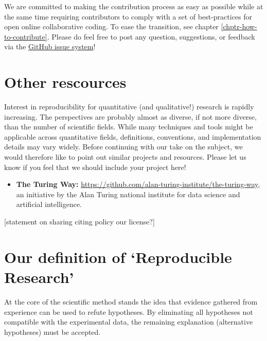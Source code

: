 \documentclass[]{book}
\providecommand{\tightlist}{%
  \setlength{\itemsep}{0pt}\setlength{\parskip}{0pt}}
\begin{document}
We are committed to making the contribution process as easy as possible
while at the same time requiring contributors to comply with a set of
best-practices for open online collaborative coding. To ease the
transition, see chapter \ref{chptr-how-to-contribute}. Please do feel
free to post any question, suggestions, or feedback via the
\href{(https://github.com/rr-mrc-bsu/reproducible-research/issues)}{GitHub
issue system}!

\section{Other rescources}\label{other-rescources}

Interest in reproducibility for quantitative (and qualitative!) research
is rapidly increasing. The perspectives are probably almost as diverse,
if not more diverse, than the number of scientific fields. While many
techniques and tools might be applicable across quantitative fields,
definitions, conventions, and implementation details may vary widely.
Before continuing with our take on the subject, we would therefore like
to point out similar projects and resources. Please let us know if you
feel that we should include your project here!

\begin{itemize}
\tightlist
\item
  \textbf{The Turing Way:}
  \url{https://github.com/alan-turing-institute/the-turing-way}, an
  initiative by the Alan Turing national institute for data science and
  artificial intelligence.
\end{itemize}

{[}statement on sharing citing policy our license?{]}

\section{\texorpdfstring{Our definition of `Reproducible
Research'}{Our definition of Reproducible Research}}\label{our-definition-of-reproducible-research}

At the core of the scientific method stands the idea that evidence
gathered from experience can be used to refute hypotheses. By
eliminating all hypotheses not compatible with the experimental data,
the remaining explanation (alternative hypotheses) must be accepted.
\end{document}
